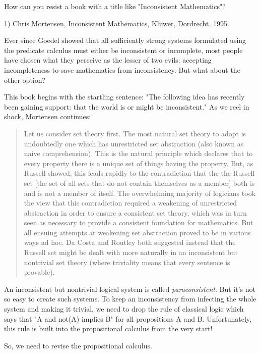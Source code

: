 


How can you resist a book with a 
title like "Inconsistent Mathematics"?

1) Chris Mortensen, Inconsistent Mathematics, Kluwer, Dordrecht, 1995.

Ever since Goedel showed that all sufficiently strong systems formulated
using the predicate calculus must either be inconsistent or incomplete,
most people have chosen what they perceive as the lesser of two evils:
accepting incompleteness to save mathematics from inconsistency.  But
what about the other option?  

This book begins with the startling sentence: "The following idea
has recently been gaining support: that the world is or might be
inconsistent." As we reel in shock, Mortensen continues:

\begin{quote}
     Let us consider set theory first.  The most natural set theory to
     adopt is undoubtedly one which has unrestricted set abstraction
     (also known as naive comprehension).  This is the natural principle
     which declares that to every property there is a unique set of
     things having the property. But, as Russell showed, this leads
     rapidly to the contradiction that the the Russell set [the set of
     all sets that do not contain themselves as a member] both is and is
     not a member of itself.  The overwhelming  majority of logicians
     took the view that this contradiction required a weakening of
     unrestricted abstraction in order to ensure a consistent set
     theory, which was in turn seen as necessary to provide a consistent
     foundation for mathematics.  But all ensuing attempts at weakening
     set abstraction proved to be in various ways ad hoc.  Da Costa and
     Routley both suggested instead that the Russell set might be dealt
     with more naturally in an inconsistent but nontrivial set theory
     (where triviality means that every sentence is provable). 
\end{quote}
An inconsistent but nontrivial logical system is called 
\emph{paraconsistent}.  
But it's not so easy to create such systems.  To keep an inconsistency
from infecting the whole system and making it trivial, we need to drop
the rule of classical logic which says that "A and not(A) implies B"
for all propositions A and B.  Unfortunately, this rule is built into the 
propositional calculus from the very start!  

So, we need to revise the propositional calculus.  

